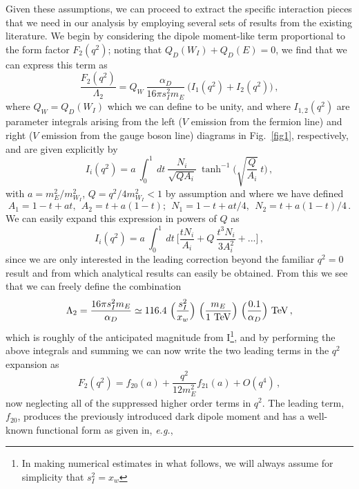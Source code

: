 \documentclass[14pt]{article}
\def\eg{{\it e.g.}}
\begin{document}
{Given these assumptions, we can proceed to extract the specific interaction pieces that we need in our analysis by employing several sets of results from the existing literature. We begin
by considering the dipole moment-like term proportional to the form factor $F_2(q^2)$; noting that $Q_D(W_I)+Q_D(E)=0$, we find that we can express this term as 
%
\begin{equation}
\frac{F_2(q^2)}{\Lambda_2}=Q_W~\frac{\alpha_D}{16\pi s_I^2 m_E}~\Big(I_1(q^2)+I_2(q^2)\Big)\,,
\end{equation}
%
where $Q_W=Q_D(W_I)$ which we can define to be unity, and where $I_{1,2}(q^2)$ are parameter integrals arising from the left ($V$ emission from the fermion line) and right ($V$ emission 
from the gauge boson line) diagrams in Fig.~\ref{fig1}, respectively, and are given explicitly by 
%
\begin{equation}
I_i(q^2)=a~\int_0^1~dt~ \frac{N_i}{\sqrt{QA_i}}~\tanh^{-1} \Big( \sqrt {\frac{Q}{A_i}}~ t\Big)\,,
\end{equation}
%
with $a=m_E^2/m_{W_I}^2$, $Q=q^2/4m_{W_I}^2<1$ by assumption and where we have defined 
%
\begin{equation}
A_1=1-t+at,~~A_2=t+a(1-t);~~N_1=1-t+at/4,~~N_2=t+a(1-t)/4\,.
\end{equation}
%
We can easily expand this expression in powers of $Q$ as
%
\begin{equation}
I_i(q^2)=a~\int_0^1~dt~ \Bigg[ \frac{tN_i}{A_i}+Q~\frac{t^3N_i}{3A_i^2}+...\Bigg]\,,
\end{equation}
%
since we are only interested in the leading correction beyond the familiar $q^2=0$ result and from which analytical results can easily be obtained. From this we see that we can freely define the combination
%
\begin{equation}
\Lambda_2=\frac{16\pi s_I^2 m_E}{\alpha_D} \simeq 116.4 ~\Big(\frac{s_I^2}{x_w}\Big)~\Big(\frac{m_E}{\rm {1~TeV}}\Big)~ \Big(\frac{0.1}{\alpha_D}\Big)~ {\rm {TeV}}\,,
\end{equation}
%
which is roughly of the anticipated magnitude from I{\footnote{In making numerical estimates in what follows, we will always assume for simplicity that $s_I^2=x_w$}}, 
and by performing the above integrals and summing we can now write the two leading terms in the $q^2$ expansion as 
%
\begin{equation}
F_2(q^2)=f_{20}(a)+\frac{q^2}{12m_E^2}f_{21}(a)+O(q^4)\,,
\end{equation}
%
now neglecting all of the suppressed higher order terms in $q^2$. 
The leading term, $f_{20}$, produces the previously introduced dark dipole moment and has a well-known functional form as given in, \eg, 
}
\end{document}
